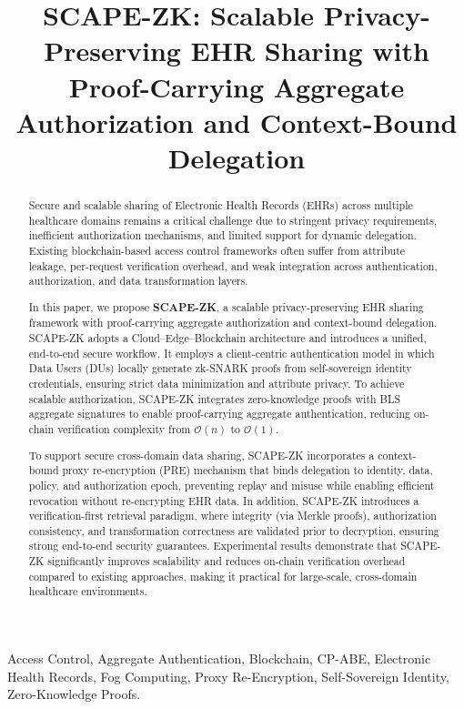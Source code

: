 \documentclass[conference]{IEEEtran}
\begin{document}
\title{SCAPE-ZK: Scalable Privacy-Preserving EHR Sharing with Proof-Carrying Aggregate Authorization and Context-Bound Delegation}

\author{
}
\maketitle

\begin{abstract}
Secure and scalable sharing of Electronic Health Records (EHRs) across multiple healthcare domains remains a critical challenge due to stringent privacy requirements, inefficient authorization mechanisms, and limited support for dynamic delegation. Existing blockchain-based access control frameworks often suffer from attribute leakage, per-request verification overhead, and weak integration across authentication, authorization, and data transformation layers.

In this paper, we propose \textbf{SCAPE-ZK}, a scalable privacy-preserving EHR sharing framework with proof-carrying aggregate authorization and context-bound delegation. SCAPE-ZK adopts a Cloud--Edge--Blockchain architecture and introduces a unified, end-to-end secure workflow. It employs a client-centric authentication model in which Data Users (DUs) locally generate zk-SNARK proofs from self-sovereign identity credentials, ensuring strict data minimization and attribute privacy. To achieve scalable authorization, SCAPE-ZK integrates zero-knowledge proofs with BLS aggregate signatures to enable proof-carrying aggregate authentication, reducing on-chain verification complexity from $\mathcal{O}(n)$ to $\mathcal{O}(1)$.

To support secure cross-domain data sharing, SCAPE-ZK incorporates a context-bound proxy re-encryption (PRE) mechanism that binds delegation to identity, data, policy, and authorization epoch, preventing replay and misuse while enabling efficient revocation without re-encrypting EHR data. In addition, SCAPE-ZK introduces a verification-first retrieval paradigm, where integrity (via Merkle proofs), authorization consistency, and transformation correctness are validated prior to decryption, ensuring strong end-to-end security guarantees. Experimental results demonstrate that SCAPE-ZK significantly improves scalability and reduces on-chain verification overhead compared to existing approaches, making it practical for large-scale, cross-domain healthcare environments.
\end{abstract}
\begin{IEEEkeywords}
Access Control, Aggregate Authentication, Blockchain, CP-ABE, Electronic Health Records, Fog Computing, Proxy Re-Encryption, Self-Sovereign Identity, Zero-Knowledge Proofs.

\end{IEEEkeywords}
\end{document}
